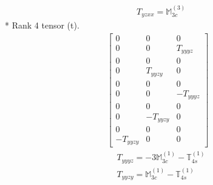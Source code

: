 \documentclass[fleqn,8pt,landscape]{jsarticle}
\begin{document}
\begin{align*}
& T_{yzxx} = \mathbb{M}_{3c}^{(3)}
\end{align*}
* Rank 4 tensor (t).
\begin{align*}
\begin{bmatrix} 0 & 0 & 0 \\ 0 & 0 & T_{yyyz} \\ 0 & 0 & 0 \\ 0 & T_{yyzy} & 0 \\ 0 & 0 & 0 \\ 0 & 0 & - T_{yyyz} \\ 0 & 0 & 0 \\ 0 & - T_{yyzy} & 0 \\ 0 & 0 & 0 \\ - T_{yyzy} & 0 & 0 \end{bmatrix}
\end{align*}
\begin{align*}
& T_{yyyz} = - 3 \mathbb{M}_{3c}^{(1)} - \mathbb{T}_{4s}^{(1)} \\
& T_{yyzy} = \mathbb{M}_{3c}^{(1)} - \mathbb{T}_{4s}^{(1)}
\end{align*}
\end{document}
